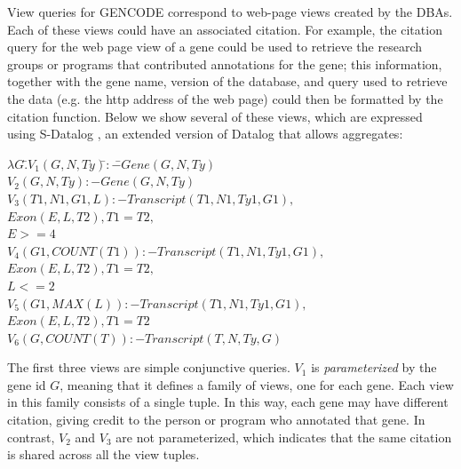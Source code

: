 View queries for GENCODE correspond to web-page views  created by the DBAs.  Each of these views could have an associated citation.  For example, the citation query for the web page view of a gene could be used to retrieve the research groups or programs that contributed annotations for the gene; this information, together with the gene name, version of the database, and query used to retrieve the data (e.g. the http address of the web page) could then be formatted by the citation function.
Below we show several of these views, which are expressed using S-Datalog \cite{consens1990low}, an extended version of Datalog that allows aggregates:
\noindent
\begin{tabbing}
$\lambda G.$\=$V_1(G, N, Ty) $\hspace{4em}\=$:-$\=$ Gene(G, N, Ty)$\\
\> $V_2(G, N, Ty) $\>$:-$\>$ Gene(G, N, Ty)$\\
\> $V_3(T1, N1, G1, L)$\>$:-$\>$Transcript(T1, N1, Ty1, G1),$\\
\>\>\>$Exon(E, L, T2), T1 = T2,$\\
\>\>\>$E >= 4$\\
\> $V_4(G1, COUNT(T1))$\>$:-$\>$Transcript(T1, N1, Ty1, G1),$\\
\>\>\>$Exon(E, L, T2), T1 = T2, $\\
\>\>\>$L <= 2$\\
\> $V_5(G1, MAX(L))$\>$:-$\>$Transcript(T1, N1, Ty1, G1),$\\
\>\>\>$Exon(E, L, T2), T1 = T2$\\
\> $V_6(G, COUNT(T)) $\>$:-$\>$ Transcript(T, N, Ty, G)$
\end{tabbing}
The first three views are simple conjunctive queries. %
$V_1$ is \textit{parameterized} by the gene id $G$, meaning that it defines a family of views, one for each gene. Each view in this family consists of a single tuple.  In this way, each gene may have different citation, giving credit to the person or program who annotated that gene. 
In contrast, $V_2$ and $V_3$ are not parameterized, which indicates that the same citation is shared across all the view tuples. 
